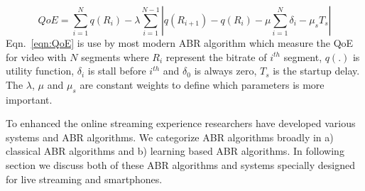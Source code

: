 \begin{equation}
	\label{eqn:QoE}
	QoE = \sum_{i=1}^N q(R_i) - \lambda\sum_{i=1}^{N-1}\left|q(R_{i+1})-q(R_i) - \mu\sum_{i=1}^N \delta_i - \mu_s T_s\right|
\end{equation}
Eqn.~\ref{eqn:QoE} is use by most modern ABR algorithm which measure the QoE for video with $N$ segments where $R_i$ represent the bitrate of $i^{th}$ segment, $q(.)$ is utility function, $\delta_i$ is stall before $i^{th}$ and $\delta_0$ is always zero, $T_s$ is the startup delay. The $\lambda$, $\mu$ and $\mu_s$ are constant weights to define which parameters is more important.

To enhanced the online streaming experience researchers have developed various systems and ABR algorithms. We categorize ABR algorithms broadly in a) classical ABR algorithms and b) learning based ABR algorithms. In following section we discuss both of these ABR algorithms and systems specially designed for live streaming and smartphones.

%
%
